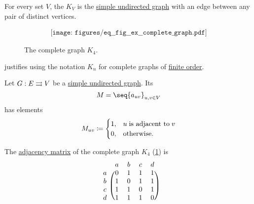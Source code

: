 \begin{example}\label{ex:complete_graph}
  For every set \( V \), the  \( K_V \) is the \hyperref[def:undirected_graph]{simple undirected graph} with an edge between any pair of distinct vertices.

  \begin{figure}
    \begin{equation}\label{eq:fig:ex:complete_graph}
      \begin{aligned}
        \texttt{[image: figures/eq\_\_fig\_\_ex\_\_complete\_graph.pdf]}
      \end{aligned}
    \end{equation}
    \caption{The complete graph \( K_4 \).}\label{fig:ex:complete_graph}
  \end{figure}

   justifies using the notation \( K_n \) for complete graphs of \hyperref[def:hypergraph/order]{finite order}.
\end{example}

\begin{definition}\label{def:graph_adjacency_matrix}
  Let \( G: E \rightrightarrows V \) be a \hyperref[def:undirected_graph]{simple undirected graph}. Its 
  \begin{equation*}
    M = \seq{ a_{uv} }_{u, v \in V}
  \end{equation*}
  has elements
  \begin{equation*}
    M_{uv} \coloneqq \begin{cases}
      1, &u \T{is adjacent to} v \\
      0, &\T{otherwise.}
    \end{cases}
  \end{equation*}
\end{definition}

\begin{example}\label{ex:def:graph_adjacency_matrix}
  The \hyperref[def:graph_adjacency_matrix]{adjacency matrix} of the complete graph \( K_4 \) (\cref{fig:ex:complete_graph}) is
  \begin{equation}\label{eq:ex:def:graph_adjacency_matrix}
    \begin{blockarray}{ccccc}
        & a & b & c & d \\
    \begin{block}{c(cccc)}
      a & 0 & 1 & 1 & 1 \\
      b & 1 & 0 & 1 & 1 \\
      c & 1 & 1 & 0 & 1 \\
      d & 1 & 1 & 1 & 0 \\
    \end{block}
    \end{blockarray}
  \end{equation}
\end{example}

